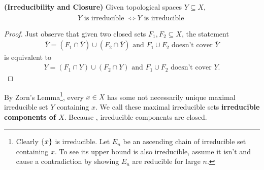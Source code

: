 \documentclass{report}
\begin{document}
\begin{theorem}
\label{IaC}
\textbf{(Irreducibility and Closure)} Given topological spaces $Y \subseteq X$, 
\begin{align*}
Y\text{ is irreducible }\iff  \overline{Y}\text{ is irreducible }
\end{align*}
\end{theorem}
\begin{proof}
Just observe that given two closed sets $F_1,F_2 \subseteq X$, the statement  
\begin{align*}
\overline{Y}=(F_1\cap \overline{Y})\cup (F_2 \cap \overline{Y})\text{ and }F_1\cup F_2\text{ doesn't cover }\overline{Y}
\end{align*}
is equivalent to 
\begin{align*}
 Y=(F_1 \cap Y)\cup  (F_2 \cap Y)\text{ and $F_1 \cup F_2$ doesn't cover }Y. 
\end{align*}
\end{proof}
By Zorn's Lemma\footnote{Clearly $\{ x \}$ is irreducible. Let $E_n$ be an ascending chain of irreducible set containing  $x$. To see its upper bound is also irreducible, assume it isn't and cause a contradiction by showing  $E_n$ are reducible for large  $n$.}, every $x \in X$ has some not necessarily unique maximal irreducible set $Y$ containing $x$. We call these maximal irreducible sets  \textbf{irreducible components of $X$}. Because , irreducible components are closed. \\
\end{document}

